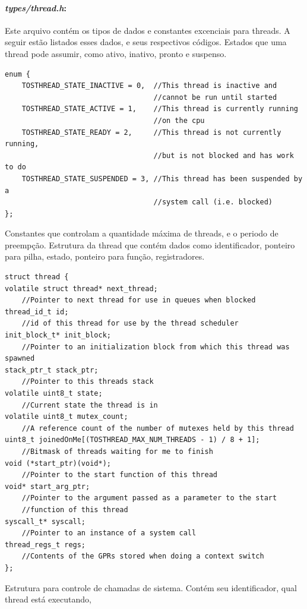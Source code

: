 \paragraph{\textit{types/thread.h}:} 
Este arquivo contém os tipos de dados e constantes excenciais para threads. A seguir estão listados esses dados, e seus
respectivos códigos.
Estados que uma thread pode assumir, como ativo, inativo, pronto e suspenso.
\begin{lstlisting}
enum {
    TOSTHREAD_STATE_INACTIVE = 0,  //This thread is inactive and 
                                   //cannot be run until started
    TOSTHREAD_STATE_ACTIVE = 1,    //This thread is currently running 
                                   //on the cpu
    TOSTHREAD_STATE_READY = 2,     //This thread is not currently running, 
                                   //but is not blocked and has work to do 
    TOSTHREAD_STATE_SUSPENDED = 3, //This thread has been suspended by a 
                                   //system call (i.e. blocked)
};
\end{lstlisting}
Constantes que controlam a quantidade máxima de threads, e o periodo de preempção.
\label{thread_t}Estrutura da thread que contém dados como identificador, ponteiro para pilha, estado, ponteiro para função,
registradores.
\begin{lstlisting}
struct thread {
volatile struct thread* next_thread;  
    //Pointer to next thread for use in queues when blocked
thread_id_t id;                       
    //id of this thread for use by the thread scheduler
init_block_t* init_block;             
    //Pointer to an initialization block from which this thread was spawned
stack_ptr_t stack_ptr;                
    //Pointer to this threads stack
volatile uint8_t state;               
    //Current state the thread is in
volatile uint8_t mutex_count;         
    //A reference count of the number of mutexes held by this thread
uint8_t joinedOnMe[(TOSTHREAD_MAX_NUM_THREADS - 1) / 8 + 1]; 
    //Bitmask of threads waiting for me to finish
void (*start_ptr)(void*);             
    //Pointer to the start function of this thread
void* start_arg_ptr;                  
    //Pointer to the argument passed as a parameter to the start 
    //function of this thread
syscall_t* syscall;                   
    //Pointer to an instance of a system call
thread_regs_t regs;                   
    //Contents of the GPRs stored when doing a context switch
};
\end{lstlisting}
Estrutura para controle de chamadas de sistema. Contém seu identificador, qual thread está executando, 
